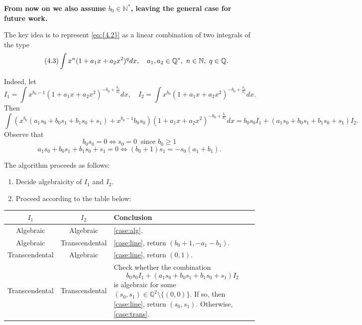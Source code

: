 \documentclass[11pt]{article}
\theoremstyle{definition}
\theoremstyle{plain}
\theoremstyle{remark}
\begin{document}
\begin{center}
\textbf{From now on we also assume $b_0\in\mathbb{N}^*$, leaving the general case for future work.} 
\end{center}

The key idea is to represent \eqref{eq:{4.2}} as a linear combination of two integrals of the type 
\begin{equation}\label{eq:{4.3}}\tag{4.3}
\int{x^n (1+a_1x+a_2x^2)^q dx}, \quad a_1,a_2 \in \mathbb{Q}^*, \ n \in \mathbb{N}, \ q \in \mathbb{Q}.
\end{equation}

Indeed, let \[I_1 = \int{x^{b_0-1}(1+a_1x+a_2x^2)^{-b_0+\frac{b_1}{a_1}}dx}, \quad I_2 = \int{x^{b_0}(1+a_1x+a_2x^2)^{-b_0+\frac{b_1}{a_1}}dx}.\]
Then
\[\int{\left(x^{b_0}(a_1s_0+b_0s_1+b_1s_0+s_1) + x^{b_0-1}b_0s_0\right)(1+a_1x+a_2x^2)^{-b_0+\frac{b_1}{a_1}}dx} = b_0s_0 I_1 + (a_1s_0+b_0s_1+b_1s_0+s_1)I_2.\]
Observe that
\[b_0s_0=0 \iff s_0 = 0 \ \text{ since } b_0\ge1\]
\[a_1s_0+b_0s_1+b_1s_0+s_1 = 0 \iff (b_0+1)s_1 = -s_0(a_1+b_1).\]


The algorithm proceeds as follows:
\begin{enumerate}
\item Decide algebraicity of \( I_1 \) and \( I_2 \).
\item Proceed according to the table below:
\end{enumerate}
\begin{center}
\renewcommand{\arraystretch}{1.5}
\begin{tabular}{|c|c|p{8.5cm}|}
\hline
\textbf{\( I_1 \)} & \textbf{\( I_2 \)} & \textbf{Conclusion} \\
\hline
Algebraic & Algebraic & \cref{case:alg}. \\
\hline
Algebraic & Transcendental & \cref{case:line}, return $(b_0+1,-a_1-b_1)$. \\
\hline
Transcendental & Algebraic & \cref{case:line}, return $(0,1)$. \\
\hline
Transcendental & Transcendental & Check whether the combination
\[
b_0s_0 I_1 + (a_1s_0 + b_0s_1 + b_1s_0 + s_1)I_2
\]
is algebraic for some \( (s_0, s_1) \in \mathbb{Q}^2 \setminus  \{(0,0)\} \).  
If so, then \cref{case:line}, return $(s_0,s_1)$. Otherwise, \cref{case:trans}. \\
\hline
\end{tabular}
\end{center}
\end{document}
